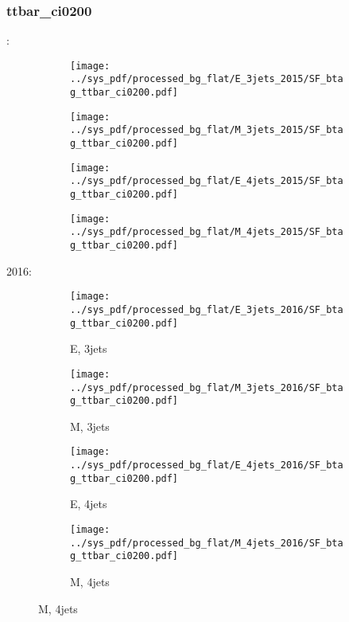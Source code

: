 \documentclass{beamer}
\begin{document}
\begin{frame}
\frametitle{ttbar_ci0200}
\fontsize{5}{1}:
\begin{figure}
\centering
\begin{subfigure}[b]{0.24\textwidth}
\texttt{[image: ../sys\_pdf/processed\_bg\_flat/E\_3jets\_2015/SF\_btag\_ttbar\_ci0200.pdf]}
\end{subfigure}
\begin{subfigure}[b]{0.24\textwidth}
\texttt{[image: ../sys\_pdf/processed\_bg\_flat/M\_3jets\_2015/SF\_btag\_ttbar\_ci0200.pdf]}
\end{subfigure}
\begin{subfigure}[b]{0.24\textwidth}
\texttt{[image: ../sys\_pdf/processed\_bg\_flat/E\_4jets\_2015/SF\_btag\_ttbar\_ci0200.pdf]}
\end{subfigure}
\begin{subfigure}[b]{0.24\textwidth}
\texttt{[image: ../sys\_pdf/processed\_bg\_flat/M\_4jets\_2015/SF\_btag\_ttbar\_ci0200.pdf]}
\end{subfigure}
\end{figure}
2016:
\begin{figure}
\centering
\begin{subfigure}[b]{0.24\textwidth}
\texttt{[image: ../sys\_pdf/processed\_bg\_flat/E\_3jets\_2016/SF\_btag\_ttbar\_ci0200.pdf]}
\captionsetup{font=tiny}
\caption{E, 3jets}
\end{subfigure}
\begin{subfigure}[b]{0.24\textwidth}
\texttt{[image: ../sys\_pdf/processed\_bg\_flat/M\_3jets\_2016/SF\_btag\_ttbar\_ci0200.pdf]}
\captionsetup{font=tiny}
\caption{M, 3jets}
\end{subfigure}
\begin{subfigure}[b]{0.24\textwidth}
\texttt{[image: ../sys\_pdf/processed\_bg\_flat/E\_4jets\_2016/SF\_btag\_ttbar\_ci0200.pdf]}
\captionsetup{font=tiny}
\caption{E, 4jets}
\end{subfigure}
\begin{subfigure}[b]{0.24\textwidth}
\texttt{[image: ../sys\_pdf/processed\_bg\_flat/M\_4jets\_2016/SF\_btag\_ttbar\_ci0200.pdf]}
\captionsetup{font=tiny}
\caption{M, 4jets}
\end{subfigure}
\end{figure}
\end{frame}
\end{document}
